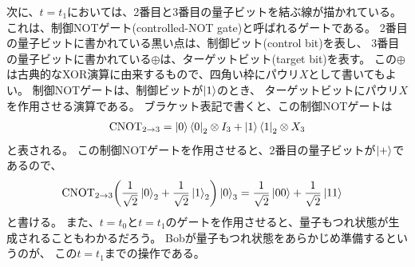 \documentclass[../master.tex]{subfiles}
\begin{document}
次に、\(t=t_1\)においては、2番目と3番目の量子ビットを結ぶ線が描かれている。
これは、制御NOTゲート(controlled-NOT gate)と呼ばれるゲートである。
2番目の量子ビットに書かれている黒い点は、制御ビット(control bit)を表し、
3番目の量子ビットに書かれている\(\oplus\)は、ターゲットビット(target bit)を表す。
この\(\oplus\)は古典的なXOR演算に由来するもので、四角い枠にパウリ\(X\)として書いてもよい。
制御NOTゲートは、制御ビットが\(\ket{1}\)のとき、
ターゲットビットにパウリ\(X\)を作用させる演算である。
ブラケット表記で書くと、この制御NOTゲートは
\begin{equation}\begin{aligned}[b]
    \text{CNOT}_{2\to 3} = \ket{0}\bra{0}_2\otimes I_3 + \ket{1}\bra{1}_2\otimes X_3
\end{aligned}\end{equation}
と表される。
この制御NOTゲートを作用させると、2番目の量子ビットが\(\ket{+}\)であるので、
\begin{equation}\begin{aligned}[b]
    \text{CNOT}_{2\to 3} \qty(\frac{1}{\sqrt{2}}\ket{0}_2+\frac{1}{\sqrt{2}}\ket{1}_2)\ket{0}_3
    &= \frac{1}{\sqrt{2}}\ket{00}+\frac{1}{\sqrt{2}}\ket{11}
\end{aligned}\end{equation}
と書ける。
また、\(t=t_0\)と\(t=t_1\)のゲートを作用させると、量子もつれ状態が生成されることもわかるだろう。
Bobが量子もつれ状態をあらかじめ準備するというのが、
この\(t=t_1\)までの操作である。
\end{document}
